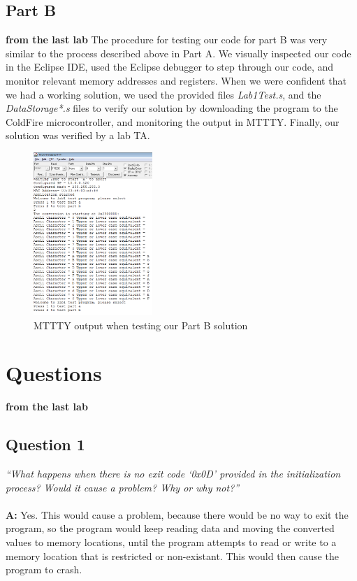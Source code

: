 \documentclass[letterpaper]{article}
\begin{document}
  \subsection{Part B}
  \textbf{from the last lab}
    The procedure for testing our code for part B was very similar to the process
    described above in Part A. We visually inspected our code in the Eclipse IDE,
    used the Eclipse debugger to step through our code, and monitor relevant
    memory addresses and registers. When we were confident that we had a working
    solution, we used the provided files \textit{Lab1Test.s}, and the \textit{DataStorage*.s}
    files to verify our solution by downloading the program to the ColdFire microcontroller,
    and monitoring the output in MTTTY. Finally, our solution was verified by a lab TA.

    \begin{figure}[H]
      \centering
      \includegraphics[width=0.4\textwidth]{tst1b.png}
      \caption{MTTTY output when testing our Part B solution}
    \end{figure}

\section{Questions}
\textbf{from the last lab}
    \subsection{Question 1}
      \textit{``What happens when there is no exit code ‘0x0D’ provided in the initialization process? Would it cause a problem? Why or why not?''}
      \\ \\
      \noindent\textbf{A:}
      Yes. This would cause a problem, because there would be no way to exit the program,
      so the program would keep reading data and moving the converted values to
      memory locations, until the program attempts to read or write to a memory
      location that is restricted or non-existant. This would then cause the
      program to crash.
\end{document}
